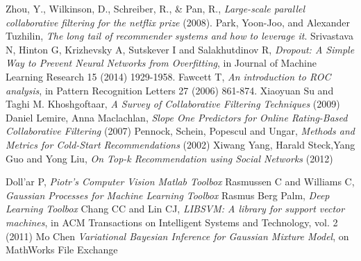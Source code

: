 \documentclass[10pt,a4paper]{article}
\begin{document}
    \begin{thebibliography}{99}

       Zhou, Y., Wilkinson, D., Schreiber, R., \& Pan, R., \textit{Large-scale parallel collaborative filtering for the netflix prize} (2008).
       Park, Yoon-Joo, and Alexander Tuzhilin, \textit{The long tail of recommender systems and how to leverage it}.
       Srivastava N, Hinton G, Krizhevsky A, Sutskever I and Salakhutdinov R, \textit{Dropout: A Simple Way to Prevent Neural Networks from Overfitting}, in Journal of Machine Learning Research 15 (2014) 1929-1958.
       Fawcett T, \textit{An introduction to ROC analysis}, in Pattern Recognition Letters 27 (2006) 861-874.
       Xiaoyuan Su and Taghi M. Khoshgoftaar, \textit{A Survey of Collaborative Filtering Techniques} (2009)
       Daniel Lemire, Anna Maclachlan, \textit{Slope One Predictors for Online Rating-Based Collaborative Filtering} (2007)
       Pennock, Schein, Popescul and Ungar, \textit{Methods and Metrics for Cold-Start Recommendations} (2002)
       Xiwang Yang, Harald Steck,Yang Guo and Yong Liu, \textit{On Top-k Recommendation using Social Networks} (2012)


       Doll'ar P, \textit{Piotr's Computer Vision Matlab Toolbox}
       Rasmussen C and Williams C, \textit{Gaussian Processes for Machine Learning Toolbox}
       Rasmus Berg Palm, \textit{Deep Learning Toolbox}
       Chang CC and Lin CJ, \textit{LIBSVM: A library for support vector machines}, in ACM Transactions on Intelligent Systems and Technology, vol. 2 (2011)
       Mo Chen \textit{Variational Bayesian Inference for Gaussian Mixture Model}, on MathWorks File Exchange

    \end{thebibliography}
\end{document}
